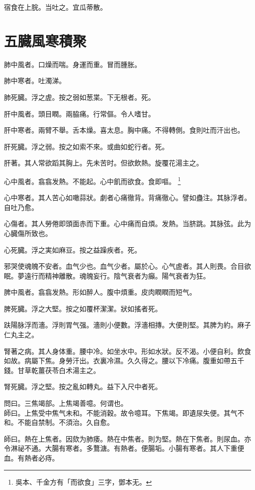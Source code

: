 宿食在上脘。当吐之。宜瓜蒂散。

\chapter{五臓風寒積聚}

肺中風者。口燥而喘。身運而重。冒而腫胀。

肺中寒者。吐濁涕。

肺死臓。浮之虗。按之弱如葱枼。下无根者。死。

肝中風者。頭目瞤。兩脇痛。行常傴。令人嗜甘。

肝中寒者。兩臂不舉。舌本燥。喜太息。胸中痛。不得轉側。食則吐而汗出也。

肝死臓。浮之弱。按之如索不來。或曲如蛇行者。死。

肝著。其人常欲蹈其胸上。先未苦时。但欲飲熱。旋覆花湯主之。

心中風者。翕翕发熱。不能起。心中飢{\khaaitp 而欲食}。食即嘔。
	\footnote{
		吳本、千金方有「而欲食」三字，鄧本无。
	}

心中寒者。其人苦心如噉蒜狀。劇者心痛徹背。背痛徹心。譬如蠱注。其脉浮者。自吐乃愈。

心傷者。其人勞倦即頭面赤而下重。心中痛而自煩。发熱。当脐跳。其脉弦。此为心臓傷所致也。

心死臓。浮之実如麻豆。按之益躁疾者。死。

邪哭使魂魄不安者。血气少也。血气少者。屬於心。心气虗者。其人則畏。合目欲眠。夢遠行而精神離散。魂魄妄行。陰气衰者为癲。陽气衰者为狂。

脾中風者。翕翕发熱。形如醉人。腹中煩重。皮肉瞤瞤而短气。

脾死臓。浮之大堅。按之如覆杯潔潔。狀如搖者死。

趺陽脉浮而濇。浮則胃气强。濇則小便數。浮濇相摶。大便則堅。其脾为約。麻子仁丸主之。

腎著之病。其人身体重。腰中冷。如坐水中。形如水狀。反不渴。小便自利。飲食如故。病屬下焦。身勞汗出。衣裏冷濕。久久得之。腰以下冷痛。腹重如帶五千錢。甘{\khaaitp 草乾}薑{\khaaitp 茯}苓{\khaaitp 白}术湯主之。

腎死臓。浮之堅。按之亂如轉丸。益下入尺中者死。

問曰。三焦竭部。上焦竭善噫。何谓也。\\
師曰。上焦受中焦气未和。不能消穀。故令噫耳。下焦竭。即遺尿失便。其气不和。不能自禁制。不須治。久自愈。

師曰。熱在上焦者。因欬为肺痿。熱在中焦者。則为堅。熱在下焦者。則尿血。亦令淋祕不通。大腸有寒者。多鶩溏。有熱者。便腸垢。小腸有寒者。其人下重便血。有熱者必痔。

